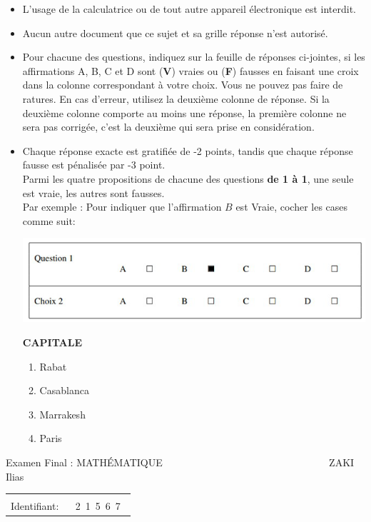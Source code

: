 \documentclass{book}%
\begin{document}
\begin{itemize}%
\item%
L'usage de la calculatrice ou de tout autre appareil électronique est interdit.%
\item%
Aucun autre document que ce sujet et sa grille réponse n'est autorisé.%
\item%
Pour chacune des questions, indiquez sur la feuille de réponses ci-jointes, si les affirmations A, B, C et D sont (\textbf{V}) vraies ou (\textbf{F}) fausses en faisant une croix dans la colonne correspondant à votre choix. Vous ne pouvez pas faire de ratures. En cas d'erreur, utilisez la deuxième colonne de réponse. Si la deuxième colonne comporte au moins une réponse, la première colonne ne sera pas corrigée, c'est la deuxième qui sera prise en considération.%
\item%
Chaque réponse exacte est gratifiée de -2 points, tandis que chaque réponse fausse est pénalisée par -3 point. \\ 	Parmi les quatre propositions de chacune des questions \textbf{de 1 à 1}, une seule est vraie, les autres sont fausses. \\ 	Par exemple : Pour indiquer que l'affirmation $B$ est Vraie, cocher les cases comme suit:  \\ \begin{center}	\includegraphics[scale=0.8]{reponses.png} \end{center}%
\thispagestyle{empty}%
\begin{exercise}%
\textbf{CAPITALE }%
\begin{enumerate}[label=\textbf{\Alph*. }]%
\item%
Rabat%
\item%
Casablanca%
\item%
Marrakesh%
\item%
Paris%
\end{enumerate}%
\end{exercise}%
\end{itemize}%
\newpage%
\thispagestyle{empty}%
Examen Final : MATHÉMATIQUE $\qquad \qquad \qquad \qquad \qquad \qquad \qquad \qquad$ ZAKI Ilias %
\begin{flushright}%
\begin{tabular}{|l|}%
\hline%
 \\%
\thispagestyle{empty}%
Identifiant: $\quad$ {\Large 2~1~5~6~7~}%
 \\%
\hline%
\end{tabular}%
\end{flushright}%
\end{document}

